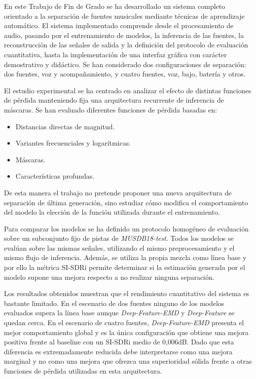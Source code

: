 En este Trabajo de Fin de Grado se ha desarrollado un sistema completo orientado a la separación de fuentes musicales mediante técnicas de aprendizaje automático.
El sistema implementado comprende desde el procesamiento de audio, pasando por el entrenamiento de modelos, la inferencia de las fuentes, la reconstrucción de las señales de salida y la definición del protocolo de evaluación cuantitativa, hasta la implementación de una interfaz gráfica con carácter demostrativo y didáctico.
Se han considerado dos configuraciones de separación: dos fuentes, voz y acompañamiento, y cuatro fuentes, voz, bajo, batería y otros.

El estudio experimental se ha centrado en analizar el efecto de distintas funciones de pérdida manteniendo fija una arquitectura recurrente de inferencia de máscaras. Se han evaluado diferentes funciones de pérdida basadas en:

\begin{itemize}
    \item Distancias directas de magnitud.
    \item Variantes frecuenciales y logarítmicas.
    \item Máscaras.
    \item Características profundas.
\end{itemize}

De esta manera el trabajo no pretende proponer una nueva arquitectura de separación de última generación, sino estudiar cómo modifica el comportamiento del modelo la elección de la función utilizada durante el entrenamiento.

Para comparar los modelos se ha definido un protocolo homogéneo de evaluación sobre un subconjunto fijo de pistas de \textit{MUSDB18-test}. Todos los modelos se evalúan sobre las mismas señales, utilizando el mismo preprocesamiento y el mismo flujo de inferencia. Además, se utiliza la propia mezcla como línea base y por ello la métrica SI-SDRi permite determinar si la estimación generada por el modelo supone una mejora respecto a no realizar ninguna separación.

Los resultados obtenidos muestran que el rendimiento cuantitativo del sistema es bastante limitado. En el escenario de dos fuentes ninguno de los modelos evaluados supera la línea base aunque \textit{Deep-Feature-EMD} y \textit{Deep-Feature} se quedan cerca.
En el escenario de cuatro fuentes, \textit{Deep-Feature-EMD} presenta el mejor comportamiento global y es la única configuración que obtiene una mejora positiva frente al baseline con un SI-SDRi medio de 0,006dB. Dado que esta diferencia es extremadamente reducida debe interpretarse como una mejora marginal y no como una mejora que ofrezca una superioridad sólida frente a otras funciones de pérdida utilizadas en esta arquitectura.

